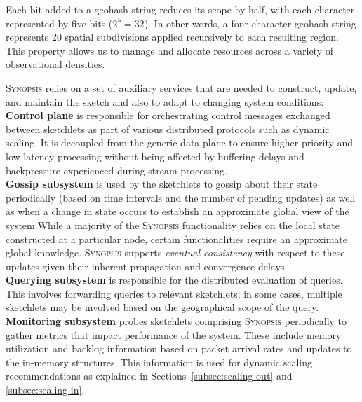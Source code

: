 Each bit added to a geohash string reduces its scope by half, with each character represented by five bits ($2^5 = 32$). In other words, a four-character geohash string represents 20 spatial subdivisions applied recursively to each resulting region. This property allows us to manage and allocate resources across a variety of observational densities.

\textsc{Synopsis} relies on a set of auxiliary services that are needed to construct, update, and maintain the sketch and also to adapt to changing system conditions:
\vspace{0.5em} \\
	\textbf{Control plane} is responsible for orchestrating control messages exchanged between sketchlets as part of various distributed protocols such as dynamic scaling.
    It is decoupled from the generic data plane to ensure higher priority and low latency processing without being affected by buffering delays and backpressure experienced during stream processing.
\vspace{0.4em} \\
	\textbf{Gossip subsystem} is used by the sketchlets to gossip about their state periodically (based on time intervals and the number of pending updates) as well as when a change in state occurs to establish an approximate global view of the system.While a majority of the \textsc{Synopsis} functionality relies on the local state constructed at a particular node, certain functionalities require an approximate global knowledge. 
    \textsc{Synopsis} supports \emph{eventual consistency} with respect to these updates given their inherent propagation and convergence delays.
\vspace{0.4em} \\
	\textbf{Querying subsystem} is responsible for the distributed evaluation of queries.
    This involves forwarding queries to relevant sketchlets; in some cases, multiple sketchlets may be involved based on the geographical scope of the query.
\vspace{0.8em} \\
    \textbf{Monitoring subsystem} probes sketchlets comprising \textsc{Synopsis} periodically to gather metrics that impact performance of the system.
    These include memory utilization and backlog information based on packet arrival rates and updates to the in-memory structures.
    This information is used for dynamic scaling recommendations as explained in Sections~\ref{subsec:scaling-out} and \ref{subsec:scaling-in}.
